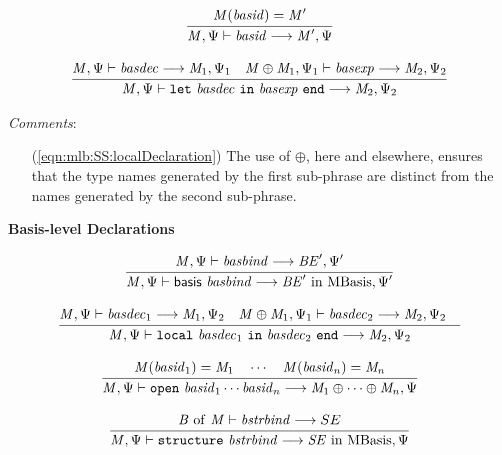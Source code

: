 \begin{equation}
{\frac{\displaystyle\strut{
\mathit{M}(\mathit{basid}) = \mathit{M}'
}}{\displaystyle\strut{
\mathit{M}, \Psi \vdash \mathit{basid} \longrightarrow \mathit{M}', \Psi
}}}
\end{equation}

\begin{equation}
\label{eqn:mlb:SS:localDeclaration}
{\frac{\displaystyle\strut{
\mathit{M}, \Psi \vdash \mathit{basdec} \longrightarrow \mathit{M}_1, \Psi_1 \quad
\mathit{M} \oplus \mathit{M}_1, \Psi_1 \vdash \mathit{basexp} \longrightarrow \mathit{M}_2, \Psi_2
}}{\displaystyle\strut{
\mathit{M}, \Psi \vdash \mathtt{let}~ \mathit{basdec} ~\mathtt{in}~ \mathit{basexp} ~\mathtt{end} \longrightarrow \mathit{M}_2, \Psi_2
}}}
\end{equation}

\noindent
\textit{Comments}:
\begin{itemize}
\item[(\ref{eqn:mlb:SS:localDeclaration})] The use of $\oplus$, here
  and elsewhere, ensures that the type names generated by the first
  sub-phrase are distinct from the names generated by the second sub-phrase.
\end{itemize}


{\large\noindent
\textbf{Basis-level Declarations} \hfill 
{}
}

\begin{equation}
{\frac{\displaystyle\strut{
\mathit{M}, \Psi  \vdash \mathit{basbind} \longrightarrow \mathit{BE}', \Psi'
}}{\displaystyle\strut{
\mathit{M}, \Psi  \vdash \mathsf{basis}~ \mathit{basbind} \longrightarrow \mathit{BE}' ~\mathrm{in}~ \mathrm{MBasis}, \Psi'
}}}
\end{equation}

\begin{equation}
{\frac{\displaystyle\strut{
\mathit{M}, \Psi  \vdash \mathit{basdec}_1 \longrightarrow \mathit{M}_1, \Psi_2 \quad
\mathit{M} \oplus \mathit{M}_1, \Psi_1  \vdash \mathit{basdec}_2 \longrightarrow \mathit{M}_2, \Psi_2 \quad
}}{\displaystyle\strut{
\mathit{M}, \Psi  \vdash \mathtt{local}~ \mathit{basdec}_1 ~\mathtt{in}~ \mathit{basdec}_2 ~\mathtt{end} \longrightarrow \mathit{M}_2, \Psi_2
}}}
\end{equation}

\begin{equation}
{\frac{\displaystyle\strut{
\mathit{M}(\mathit{basid}_1) = \mathit{M}_1 \quad \cdots \quad
\mathit{M}(\mathit{basid}_n) = \mathit{M}_n 
}}{\displaystyle\strut{
\mathit{M}, \Psi  \vdash \mathtt{open}~ \mathit{basid}_1 \cdots \mathit{basid}_n \longrightarrow \mathit{M}_1 \oplus \cdots \oplus \mathit{M}_n, \Psi
}}}
\end{equation}

\begin{equation}
{\frac{\displaystyle\strut{
\mathit{B}~\mathrm{of}~\mathit{M} \vdash \mathit{bstrbind} \longrightarrow SE
}}{\displaystyle\strut{
\mathit{M}, \Psi  \vdash \mathtt{structure}~ \mathit{bstrbind}
\longrightarrow \mathit{SE} ~\mathrm{in}~ \mathrm{MBasis}, \Psi
}}}
\end{equation}

